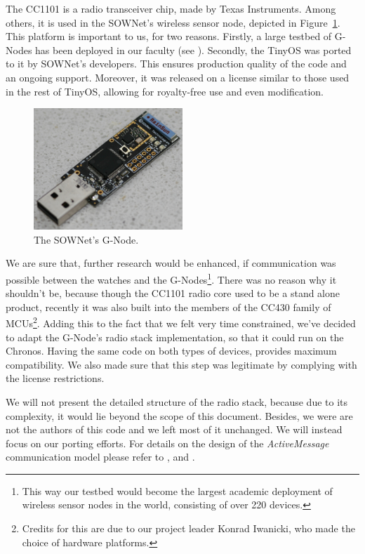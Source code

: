The CC1101 is a radio transceiver chip, made by Texas Instruments. Among others, it is used in the SOWNet's \cite{G-Node} wireless sensor node, depicted in Figure~\ref{fig:gnode}. This platform is important to us, for two reasons. Firstly, a large testbed of G-Nodes has been deployed in our faculty (see \cite{MM}). Secondly, the TinyOS was ported to it by SOWNet's developers. This ensures production quality of the code and an ongoing support. Moreover, it was released on a license similar to those used in the rest of TinyOS, allowing for royalty-free use and even modification.
\begin{figure}[h]
  \centering
  \includegraphics[width=0.5\textwidth]{img/gnode.jpg}
  \caption{The SOWNet's G-Node.}
  \label{fig:gnode}
\end{figure}
We are sure that, further research would be enhanced, if communication was possible between the watches and the G-Nodes\footnote{This way our testbed would become the largest academic deployment of wireless sensor nodes in the world, consisting of over 220 devices.}. There was no reason why it shouldn't be, because though the CC1101 radio core used to be a stand alone product, recently it was also built into the members of the CC430 family of MCUs\footnote{Credits for this are due to our project leader Konrad Iwanicki, who made the choice of hardware platforms.}. Adding this to the fact that we felt very time constrained, we've decided to adapt the G-Node's radio stack implementation, so that it could run on the Chronos. Having the same code on both types of devices, provides maximum compatibility. We also made sure that this step was legitimate by complying with the license restrictions.

We will not present the detailed structure of the radio stack, because due to its complexity, it would lie beyond the scope of this document. Besides, we were are not the authors of this code and we left most of it unchanged. We will instead focus on our porting efforts. For details on the design of the \emph{ActiveMessage} communication model please refer to \cite{BHC}, \cite{TEP116} and \cite{TEP126}.


